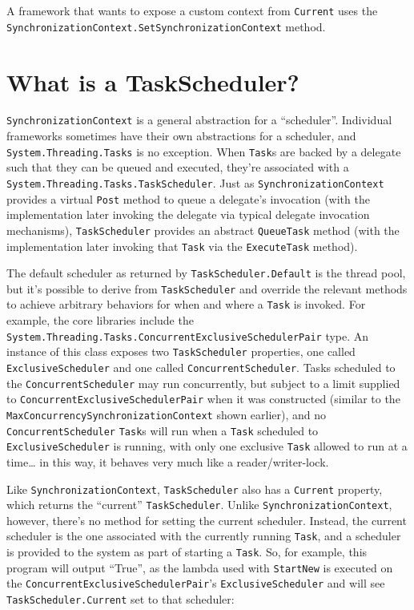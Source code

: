 \documentclass[a4paper,12pt,notitlepage,twoside,openright]{article}
\begin{document}
A framework that wants to expose a custom context from \texttt{Current}
uses the \texttt{SynchronizationContext.SetSynchronizationContext}
method.

\hypertarget{what-is-a-taskscheduler}{%
\section{What is a TaskScheduler?}\label{what-is-a-taskscheduler}}

\texttt{SynchronizationContext} is a general abstraction for a
``scheduler''. Individual frameworks sometimes have their own
abstractions for a scheduler, and \texttt{System.Threading.Tasks} is no
exception. When \texttt{Task}s are backed by a delegate such that they
can be queued and executed, they're associated with a
\texttt{System.Threading.Tasks.TaskScheduler}. Just as
\texttt{SynchronizationContext} provides a virtual \texttt{Post} method
to queue a delegate's invocation (with the implementation later invoking
the delegate via typical delegate invocation mechanisms),
\texttt{TaskScheduler} provides an abstract \texttt{QueueTask} method
(with the implementation later invoking that \texttt{Task} via the
\texttt{ExecuteTask} method).

The default scheduler as returned by \texttt{TaskScheduler.Default} is
the thread pool, but it's possible to derive from \texttt{TaskScheduler}
and override the relevant methods to achieve arbitrary behaviors for
when and where a \texttt{Task} is invoked. For example, the core
libraries include the
\texttt{System.Threading.Tasks.ConcurrentExclusiveSchedulerPair} type.
An instance of this class exposes two \texttt{TaskScheduler} properties,
one called \texttt{ExclusiveScheduler} and one called
\texttt{ConcurrentScheduler}. Tasks scheduled to the
\texttt{ConcurrentScheduler} may run concurrently, but subject to a
limit supplied to \texttt{ConcurrentExclusiveSchedulerPair} when it was
constructed (similar to the
\texttt{MaxConcurrencySynchronizationContext} shown earlier), and no
\texttt{ConcurrentScheduler} \texttt{Task}s will run when a
\texttt{Task} scheduled to \texttt{ExclusiveScheduler} is running, with
only one exclusive \texttt{Task} allowed to run at a time\ldots{} in
this way, it behaves very much like a reader/writer-lock.

Like \texttt{SynchronizationContext}, \texttt{TaskScheduler} also has a
\texttt{Current} property, which returns the ``current''
\texttt{TaskScheduler}. Unlike \texttt{SynchronizationContext}, however,
there's no method for setting the current scheduler. Instead, the
current scheduler is the one associated with the currently running
\texttt{Task}, and a scheduler is provided to the system as part of
starting a \texttt{Task}. So, for example, this program will output
``True'', as the lambda used with \texttt{StartNew} is executed on the
\texttt{ConcurrentExclusiveSchedulerPair}'s \texttt{ExclusiveScheduler}
and will see \texttt{TaskScheduler.Current} set to that scheduler:
\end{document}
